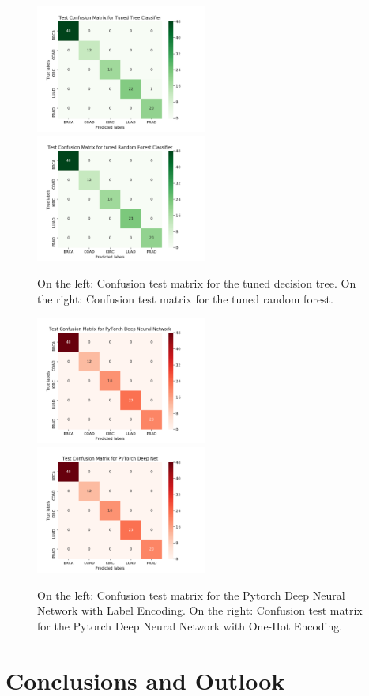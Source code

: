 \documentclass[12pt]{article}
\begin{document}
\begin{figure}[h!]
\centering
\advance\leftskip-4cm
\advance\rightskip-4cm
\includegraphics[width=0.50\textwidth]{img/matrix_tree}
\includegraphics[width=0.50\textwidth]{img/matrix_forest}
\caption{On the left: Confusion test matrix for the tuned decision tree. On the right: Confusion test matrix for the tuned random forest.}
\label{fig_treeandforest}
\end{figure}

\begin{figure}[h!]
\centering
\advance\leftskip-4cm
\advance\rightskip-4cm
\includegraphics[width=0.50\textwidth]{img/matrix_py_enc}
\includegraphics[width=0.50\textwidth]{img/matrix_py_hot}
\caption{On the left: Confusion test matrix for the Pytorch Deep Neural Network with Label Encoding. On the right: Confusion test matrix for the Pytorch Deep Neural Network with One-Hot Encoding.}
\label{fig_torch}
\end{figure}

\newpage

\section{Conclusions and Outlook}






\end{document}
